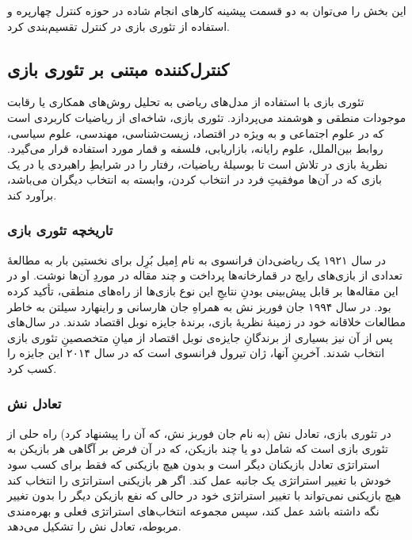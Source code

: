 این بخش را می‌توان به دو قسمت پیشینه کارهای انجام شاده در حوزه کنترل چهارپره و استفاده از تئوری بازی
در کنترل تقسیم‌بندی کرد.
\subsection{کنترل‌کننده مبتنی بر تئوری بازی}
تئوری بازی با استفاده از مدل‌های ریاضی به تحلیل روش‌های همکاری یا رقابت موجودات منطقی و هوشمند می‌پردازد. تئوری بازی، شاخه‌ای از ریاضیات کاربردی است که در علوم اجتماعی و به ویژه در اقتصاد، زیست‌شناسی، مهندسی، علوم سیاسی، روابط بین‌الملل، علوم رایانه، بازاریابی، فلسفه و قمار مورد استفاده قرار می‌گیرد. نظریهٔ بازی در تلاش است تا بوسیلهٔ ریاضیات، رفتار را در شرایطِ راهبردی یا در یک بازی که در آن‌ها موفقیتِ فرد در انتخاب کردن، وابسته به انتخاب دیگران می‌باشد، برآورد کند.
\subsubsection{تاریخچه تئوری بازی}
در سال ۱۹۲۱ یک ریاضی‌دان فرانسوی به نام اِمیل بُرِل برای نخستین بار به مطالعهٔ تعدادی از بازی‌های رایج در قمارخانه‌ها پرداخت و چند مقاله در موردِ آن‌ها نوشت. او در این مقاله‌ها بر قابل پیش‌بینی بودنِ نتایجِ این نوع بازی‌ها از راه‌های منطقی، تأکید کرده بود. در سال ۱۹۹۴ جان فوربز نش به همراهِ جان هارسانی و راینهارد سیلتن به خاطر مطالعات خلاقانه خود در زمینهٔ نظریهٔ بازی، برندهٔ جایزه نوبل اقتصاد شدند. در سال‌های پس از آن نیز بسیاری از برندگانِ جایزه‌ی نوبل اقتصاد از میانِ متخصصینِ تئوری بازی انتخاب شدند. آخرینِ آنها، ژان تیرول فرانسوی است که در سال ۲۰۱۴ این جایزه را کسب کرد.
\subsubsection{تعادل نش}
در تئوری بازی، تعادل نش (به نام جان فوربز نش، که آن را پیشنهاد کرد) راه حلی از تئوری بازی است که شامل دو یا چند بازیکن، که در آن فرض بر آگاهی هر بازیکن به استراتژی تعادل بازیکنان دیگر است و بدون هیچ بازیکنی که فقط برای کسب سود خودش با تغییر استراتژی یک جانبه عمل کند. اگر هر بازیکنی استراتژی را انتخاب کند هیچ بازیکنی نمی‌تواند با تغییر استراتژی خود در حالی که نفع بازیکن دیگر را بدون تغییر نگه داشته باشد عمل کند، سپس مجموعه انتخاب‌های استراتژی فعلی و بهره‌مندی مربوطه، تعادل نش را تشکیل می‌دهد.
